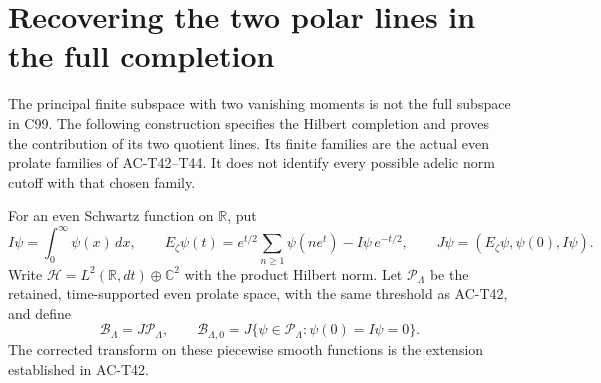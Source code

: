 \section{Recovering the two polar lines in the full completion}
\label{sec:trace-polar-completion}

The principal finite subspace with two vanishing moments is not
the full subspace in C99.  The following construction specifies
the Hilbert completion and proves the contribution of its two
quotient lines.  Its finite families are the actual even prolate
families of AC-T42--T44.  It does not identify every possible
adelic norm cutoff with that chosen family.

For an even Schwartz function on $\mathbb R$, put
\[
 I\psi=\int_0^\infty\psi(x)\,dx,\qquad
 E_\zeta\psi(t)=e^{t/2}\sum_{n\geq1}\psi(ne^t)
                         -I\psi\,e^{-t/2},\qquad
 J\psi=(E_\zeta\psi,\psi(0),I\psi).
 \tag{PC.1}
\]
Write $\mathcal H=L^2(\mathbb R,dt)\oplus\mathbb C^2$ with
the product Hilbert norm.  Let $\mathcal P_\Lambda$ be the
retained, time-supported even prolate space, with the same
threshold as AC-T42, and define
\[
 \mathcal B_\Lambda=J\mathcal P_\Lambda,\qquad
 \mathcal B_{\Lambda,0}
  =J\{\psi\in\mathcal P_\Lambda:\psi(0)=I\psi=0\}.
 \tag{PC.2}
\]
The corrected transform on these piecewise smooth functions
is the extension established in AC-T42.

